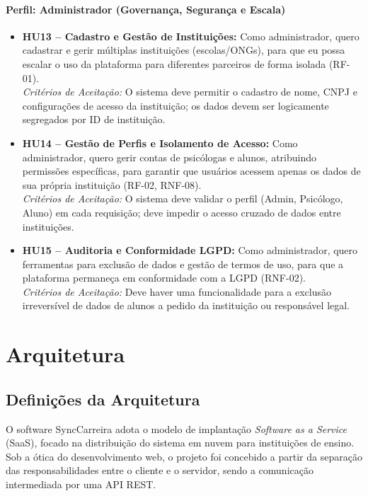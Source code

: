 \paragraph{Perfil: Administrador (Governança, Segurança e Escala)}

\begin{itemize}
    \item \textbf{HU13 -- Cadastro e Gestão de Instituições:} Como administrador, quero cadastrar e gerir múltiplas instituições (escolas/ONGs), para que eu possa escalar o uso da plataforma para diferentes parceiros de forma isolada (RF-01). \\
    \textit{Critérios de Aceitação:} O sistema deve permitir o cadastro de nome, CNPJ e configurações de acesso da instituição; os dados devem ser logicamente segregados por ID de instituição.

    \item \textbf{HU14 -- Gestão de Perfis e Isolamento de Acesso:} Como administrador, quero gerir contas de psicólogas e alunos, atribuindo permissões específicas, para garantir que usuários acessem apenas os dados de sua própria instituição (RF-02, RNF-08). \\
    \textit{Critérios de Aceitação:} O sistema deve validar o perfil (Admin, Psicólogo, Aluno) em cada requisição; deve impedir o acesso cruzado de dados entre instituições.

    \item \textbf{HU15 -- Auditoria e Conformidade LGPD:} Como administrador, quero ferramentas para exclusão de dados e gestão de termos de uso, para que a plataforma permaneça em conformidade com a LGPD (RNF-02). \\
    \textit{Critérios de Aceitação:} Deve haver uma funcionalidade para a exclusão irreversível de dados de alunos a pedido da instituição ou responsável legal.
\end{itemize}

\section{Arquitetura}

\subsection{Definições da Arquitetura}

O software SyncCarreira adota o modelo de implantação \textit{Software as a Service} (SaaS), focado na distribuição do sistema em nuvem para instituições de ensino. Sob a ótica do desenvolvimento web, o projeto foi concebido a partir da separação das responsabilidades entre o cliente e o servidor, sendo a comunicação intermediada por uma API REST.

